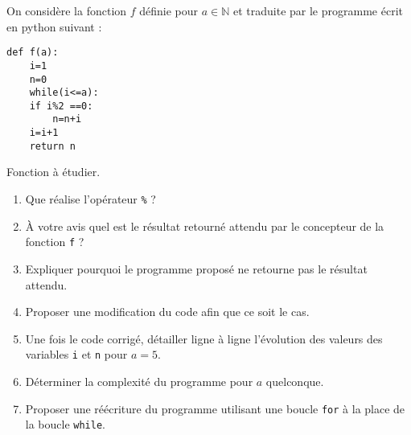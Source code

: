 On considère la fonction $f$ définie pour $a \in \mathbb{N}$ et traduite par le programme écrit en python suivant :

\begin{listing}
\begin{verbatim}
def f(a):
    i=1
    n=0
    while(i<=a):
	if i%2 ==0:
	    n=n+i
	i=i+1
	return n
\end{verbatim}
\caption{Fonction à étudier.}
\label{prog:fonctionf}
\end{listing}

\begin{enumerate}
 \item Que réalise l'opérateur \texttt{\%} ? 
 \item À votre avis quel est le résultat retourné attendu par le concepteur de la fonction \texttt{f} ?
 \item Expliquer pourquoi le programme proposé ne retourne pas le résultat attendu.
 \item Proposer une modification du code afin que ce soit le cas.
 \item Une fois le code corrigé, détailler ligne à ligne l'évolution des valeurs des variables \texttt{i} et \texttt{n} pour $a=5$.
 \item Déterminer la complexité du programme pour $a$ quelconque.
 \item Proposer une réécriture du programme utilisant une boucle \texttt{for} à la place de la boucle \texttt{while}.
\end{enumerate}





